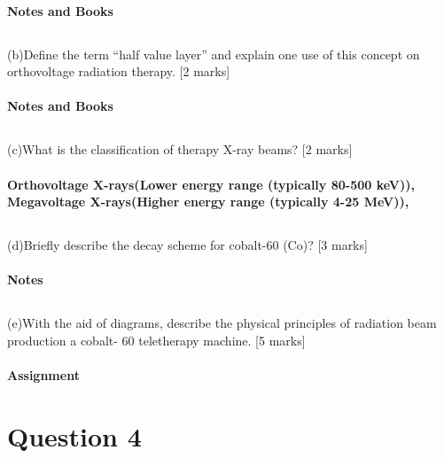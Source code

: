 \documentclass[11pt,letterpaper]{article}
\begin{document}
\paragraph*{Notes and Books}

\subsection*{}(b)Define the term “half value layer” and explain one use of this concept on orthovoltage radiation
therapy. [2 marks]

\paragraph*{Notes and Books}
\subsection*{}(c)What is the classification of therapy X-ray beams? [2 marks]

\paragraph*{Orthovoltage X-rays(Lower energy range (typically 80-500 keV)), Megavoltage X-rays(Higher energy range (typically 4-25 MeV)), }

\subsection*{}(d)Briefly describe the decay scheme for cobalt-60 (Co)? [3 marks]

\paragraph*{Notes}

\subsection*{}(e)With the aid of diagrams, describe the physical principles of radiation beam production a cobalt- 60 teletherapy machine. [5 marks]

\paragraph*{Assignment}
\newpage
\section{Question 4}
\end{document}

